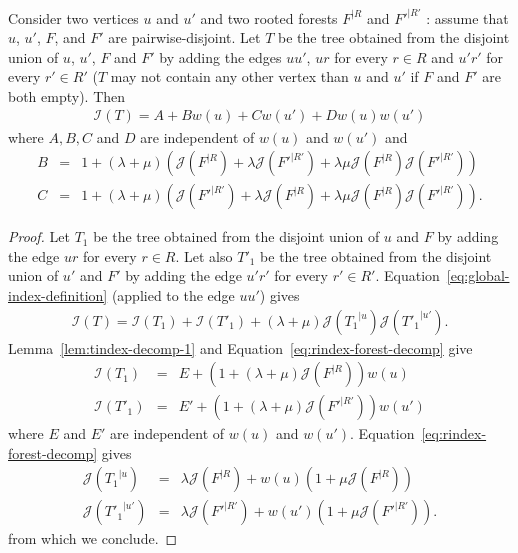\documentclass[11 pt]{modarticle}
\newcommand{\wmap}{w}
\newcommand{\rtree}[2]{{#1}^{\lvert #2}}
\newcommand{\indexsymbol}{\mathcal{I}}
\newcommand{\tindex}[1]{\indexsymbol(#1)}
\newcommand{\rindexsymbol}{\mathcal{J}}
\newcommand{\rindex}[2]{\rindexsymbol(\rtree{#2}{#1})}
\begin{document}
\begin{lem}\label{lem:tindex-decomp-3}
Consider two vertices $u$ and $u'$ and two rooted forests $\rtree{F}{R}$ and $\rtree{F'}{R'}$ : assume that $u$, $u'$, $F$, and $F'$ are pairwise-disjoint. Let $T$ be the tree obtained from the disjoint union of $u$, $u'$, $F$ and $F'$ by adding the edges $uu'$, $ur$ for every $r \in R$ and $u'r'$ for every $r' \in R'$ ($T$ may not contain any other vertex than $u$ and $u'$ if $F$ and $F'$ are both empty). Then
\begin{eqnarray*}
	\tindex{T} = A + B \wmap(u) + C \wmap(u') + D \wmap(u) \wmap(u')
\end{eqnarray*}
where $A,B,C$ and $D$ are independent of $\wmap(u)$ and $\wmap(u')$ and
\begin{eqnarray*}
	B & = & 1 + (\lambda + \mu)\left( \rindex{R}{F} + \lambda \rindex{R'}{F'} + \lambda \mu \rindex{R}{F} \rindex{R'}{F'} \right) \\
	C & = & 1 + (\lambda + \mu)\left( \rindex{R'}{F'} + \lambda \rindex{R}{F} + \lambda \mu \rindex{R}{F} \rindex{R'}{F'} \right) .
\end{eqnarray*}
\end{lem}

\begin{proof}
Let $T_1$ be the tree obtained from the disjoint union of $u$ and $F$ by adding the edge $ur$ for every $r \in R$. Let also $T'_1$ be the tree obtained from the disjoint union of $u'$ and $F'$ by adding the edge $u'r'$ for every $r' \in R'$. Equation~\eqref{eq:global-index-definition} (applied to the edge $uu'$) gives
\begin{eqnarray*}
	\tindex{T} = \tindex{T_1} + \tindex{T'_1} + (\lambda + \mu) \rindex{u}{T_1} \rindex{u'}{T'_1}.
\end{eqnarray*}
Lemma~\ref{lem:tindex-decomp-1} and Equation~\eqref{eq:rindex-forest-decomp} give
\begin{eqnarray*}
	\tindex{T_1} & = & E + \left(1 + (\lambda + \mu)\rindex{R}{F}\right) \wmap(u) \\
	\tindex{T'_1} & = & E' + \left(1 + (\lambda + \mu)\rindex{R'}{F'}\right) \wmap(u')
\end{eqnarray*}
where $E$ and $E'$ are independent of $\wmap(u)$ and $\wmap(u')$. Equation~\eqref{eq:rindex-forest-decomp} gives
\begin{eqnarray*}
	\rindex{u}{T_1} & = & \lambda \rindex{R}{F} + \wmap(u)(1 + \mu \rindex{R}{F}) \\
	\rindex{u'}{T'_1} & = & \lambda \rindex{R'}{F'} + \wmap(u') (1 + \mu \rindex{R'}{F'}).
\end{eqnarray*}
from which we conclude.
\end{proof}
\end{document}

